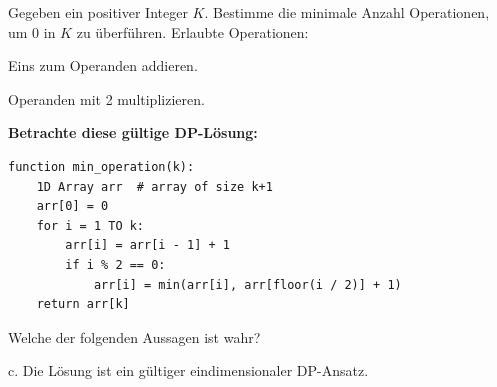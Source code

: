 \begin{contentbox}
Gegeben ein positiver Integer $K$. Bestimme die minimale Anzahl Operationen, um $0$ in $K$ zu überführen. Erlaubte Operationen:\\
\begin{factlist}
    \item Eins zum Operanden addieren.
    \item Operanden mit 2 multiplizieren.
\end{factlist}

\textbf{Betrachte diese gültige DP-Lösung:}
\end{contentbox}
\begin{codebox}
\begin{lstlisting}[style=CodeExpert]
function min_operation(k):
    1D Array arr  # array of size k+1
    arr[0] = 0
    for i = 1 TO k:
        arr[i] = arr[i - 1] + 1
        if i % 2 == 0:
            arr[i] = min(arr[i], arr[floor(i / 2)] + 1)
    return arr[k]
\end{lstlisting}
\end{codebox}
\begin{contentbox}
Welche der folgenden Aussagen ist wahr?
\begin{factlist}
    \item c. Die Lösung ist ein gültiger eindimensionaler DP-Ansatz.
\end{factlist}
\end{contentbox}

